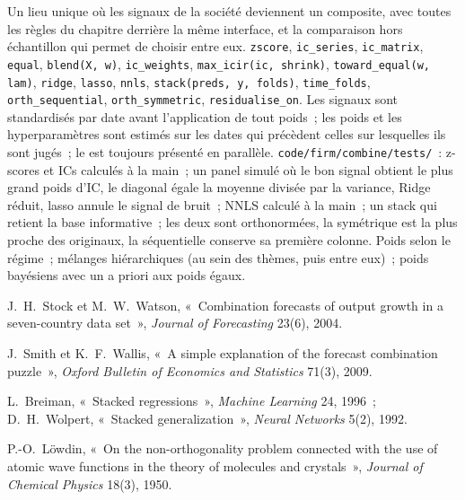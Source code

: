 \begin{build}
 Un lieu unique où les signaux de la société deviennent un composite, avec toutes les règles du chapitre derrière la même interface, et la
comparaison hors échantillon qui permet de choisir entre eux.
 \texttt{zscore}, \texttt{ic\_series}, \texttt{ic\_matrix}, \texttt{equal}, \texttt{blend(X, w)}, \texttt{ic\_weights},
\texttt{max\_icir(ic, shrink)}, \texttt{toward\_equal(w, lam)}, \texttt{ridge}, \texttt{lasso}, \texttt{nnls}, \texttt{stack(preds, y, folds)},
\texttt{time\_folds}, \texttt{orth\_sequential}, \texttt{orth\_symmetric}, \texttt{residualise\_on}.
 Les signaux sont standardisés par date avant l'application de tout poids~; les poids et les hyperparamètres sont estimés sur les dates qui précèdent celles sur lesquelles
ils sont jugés~; le  est toujours présenté en parallèle.
 \texttt{code/firm/combine/tests/}~: z-scores et ICs calculés à la main~; un panel simulé où le bon signal obtient le plus grand poids d'IC,
le  diagonal égale la moyenne divisée par la variance, Ridge réduit, lasso annule le signal de bruit~; NNLS calculé à la main~; un stack qui retient la
base informative~; les deux  sont orthonormées, la symétrique est la plus proche des originaux, la séquentielle conserve sa première colonne.
 Poids selon le régime~; mélanges hiérarchiques (au sein des thèmes, puis entre eux)~; poids bayésiens avec un a priori aux poids égaux.
\end{build}

\begin{omsources}
\item J.~H.~Stock et M.~W.~Watson, «~Combination forecasts of output growth in a seven-country data set~», \emph{Journal of Forecasting}
23(6), 2004.
\item J.~Smith et K.~F.~Wallis, «~A simple explanation of the forecast combination puzzle~», \emph{Oxford Bulletin of Economics and Statistics}
71(3), 2009.
\item L.~Breiman, «~Stacked regressions~», \emph{Machine Learning} 24, 1996~; D.~H.~Wolpert, «~Stacked generalization~», \emph{Neural Networks}
5(2), 1992.
\item P.-O.~Löwdin, «~On the non-orthogonality problem connected with the use of atomic wave functions in the theory of molecules and
crystals~», \emph{Journal of Chemical Physics} 18(3), 1950.
\end{omsources}

